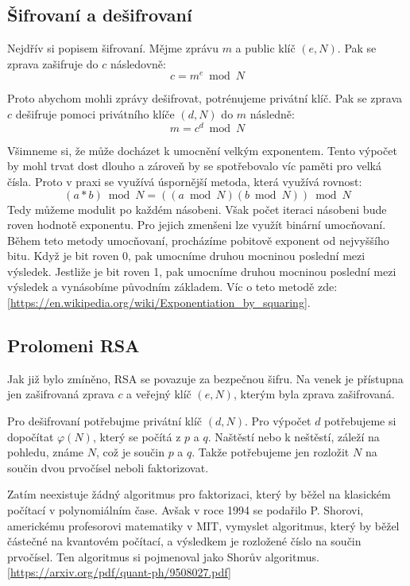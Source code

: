 \documentclass[11pt]{article}
\begin{document}
\subsection{Šifrovaní a dešifrovaní}
Nejdřív si popisem šifrovaní.
Mějme zprávu $m$ a public klíč $(e, N)$.
Pak se zprava zašifruje do $c$ následovně:
$$c = m^e \bmod N$$
\par Proto abychom mohli zprávy dešifrovat, potrénujeme privátní klíč.
Pak se zprava $c$ dešifruje pomoci privátního klíče $(d, N)$ do $m$ následně:
$$m = c^d \bmod N$$
\par Všimneme si, že může docházet k umocnění velkým exponentem.
Tento výpočet by mohl trvat dost dlouho a zároveň by se spotřebovalo víc paměti pro velká čísla.
Proto v praxi se využívá úspornější metoda, která využívá rovnost:
$$(a * b) \bmod N = ((a \bmod N)(b \bmod N)) \bmod N$$
Tedy můžeme modulit po každém násobeni.
Však počet iteraci násobeni bude roven hodnotě exponentu.
Pro jejich zmenšeni lze využít binární umocňovaní.
Během teto metody umocňovaní, procházíme pobitově exponent od nejvyššího bitu.
Když je bit roven 0, pak umocníme druhou mocninou poslední mezi výsledek.
Jestliže je bit roven 1, pak umocníme druhou mocninou poslední mezi výsledek a vynásobíme původním základem.
Víc o teto metodě zde: [\url{https://en.wikipedia.org/wiki/Exponentiation_by_squaring}].

\subsection{Prolomeni RSA}
Jak již bylo zmíněno, RSA se povazuje za bezpečnou šifru.
Na venek je přístupna jen zašifrovaná zprava $c$ a veřejný klíč $(e, N)$, kterým byla zprava zašifrovaná.

\par Pro dešifrovaní potřebujme privátní klíč $(d, N)$.
Pro výpočet $d$ potřebujeme si dopočítat $\varphi (N)$, který se počítá z $p$ a $q$.
Naštěstí nebo k neštěstí, záleží na pohledu, známe $N$, což je součin $p$ a $q$.
Takže potřebujeme jen rozložit $N$ na součin dvou prvočísel neboli faktorizovat.

\par Zatím neexistuje žádný algoritmus pro faktorizaci, který by běžel na klasickém počítací v polynomiálním čase.
Avšak v roce 1994 se podařilo P. Shorovi, americkému profesorovi matematiky v MIT, vymyslet algoritmus, který by běžel částečné na kvantovém počítací, a výsledkem je rozložené číslo na součin prvočísel.
Ten algoritmus si pojmenoval jako Shorův algoritmus.[\url{https://arxiv.org/pdf/quant-ph/9508027.pdf}]
\end{document}

